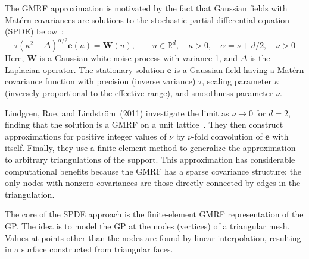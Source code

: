 \documentclass[]{interact}
\begin{document}
The GMRF approximation is motivated by the fact that Gaussian fields with
Mat\'{e}rn covariances are solutions to the stochastic partial differential
equation (SPDE) below~\cite{lindgrenetal}:
\begin{equation}
\tau(\kappa^{2} - \Delta)^{\alpha / 2} \mathbf{e}(u) = \mathbf{W}(u),
\qquad u \in \mathbb{R}^d, \quad \kappa > 0,
\quad \alpha = \nu + d/2, \quad \nu > 0
\end{equation}
Here, \(\mathbf{W}\) is a Gaussian white noise process with variance 1, and
\(\Delta\) is the Laplacian operator. The stationary solution
\(\mathbf{e}\) is a Gaussian field having a Mat\'{e}rn covariance
function with precision (inverse variance) \(\tau\),  scaling parameter
\(\kappa\) (inversely proportional to the effective range), and smoothness
parameter \(\nu\).

Lindgren, Rue, and Lindstr\"{o}m~(2011) investigate the limit as \(\nu \to 0\) for
\(d = 2\), finding that the solution is a GMRF on a unit
lattice~\cite{lindgrenetal}. They then construct approximations for positive
integer values of \(\nu\) by \(\nu\)-fold convolution of \(\mathbf{e}\)
with itself. Finally, they use a finite element method to generalize the
approximation to arbitrary triangulations of the support. This approximation
has considerable computational benefits because the GMRF has a sparse
covariance structure; the only nodes with nonzero covariances are those
directly connected by edges in the triangulation.

The core of the SPDE approach is the finite-element GMRF representation of the
GP. The idea is to model the GP at the nodes (vertices) of a triangular mesh.
Values at points other than the nodes are found by linear interpolation,
resulting in a surface constructed from triangular faces.
\end{document}

